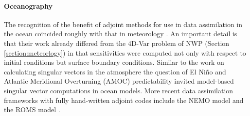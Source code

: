 \paragraph{Oceanography}

The recognition of the benefit of adjoint methods for use in data assimilation in the ocean coincided roughly with that in meteorology \cite{Thacker:1988kp,Thacker:1988ed,Thacker:1989jf,Tziperman.1989,Tziperman:1992hg,Tziperman:1992jw}. 
An important detail is that their work already differed from the 4D-Var problem of NWP (Section \ref{section:meteorlogy}) in that sensitivities were computed not only with respect to initial conditions but surface boundary conditions.
Similar to the work on calculating singular vectors in the atmosphere 
the question of El Ni\~no \cite{Moore.1997ah,Moore.1997}
and Atlantic Meridional Overturning (AMOC) \cite{Zanna.2010,Zanna:2011ge,Zanna:2012dw}
predictability invited model-based singular vector computations in ocean models. 
More recent data assimilation frameworks with fully hand-written adjoint codes include the NEMO model \cite{Weaver.2003,Vidard:2015kj} and the ROMS model \cite{Moore:2004fk,Moore:2011bc}.


